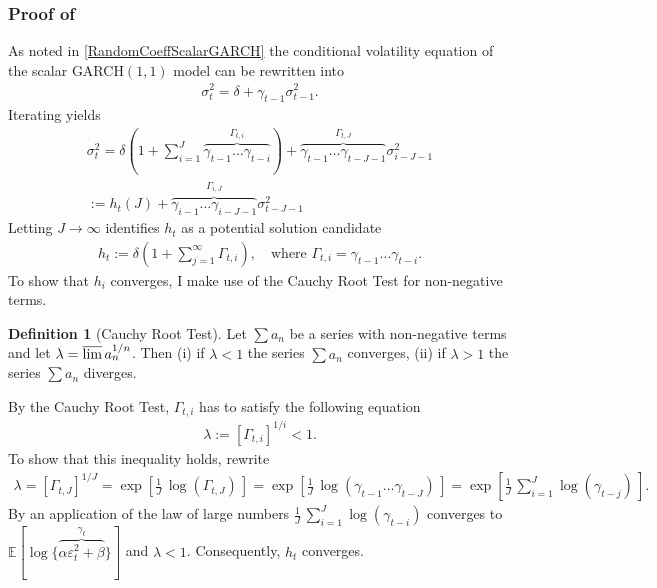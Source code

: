 \documentclass[12pt,a4paper]{article}
\theoremstyle{definition}
\newtheorem{definition}{Definition}[section]
\begin{document}
\subsubsection[Proof of Theorem 2.1]{Proof of }
\label{subsec:Proofofstationarityscalar}
As noted in \cref{RandomCoeffScalarGARCH} the conditional volatility equation of the scalar GARCH$(1,1)$ model can be rewritten into
\begin{gather}
    \sigma_t^2 = \delta + \gamma_{t-1} \sigma_{t-1}^2.
\end{gather}
Iterating yields
\begin{gather}
\label{IterationvolatilityscalarGARCH}
    \sigma_t^2 = \delta \left(1 + \sum_{i=1}^J \overbrace{\gamma_{t-1}\dots\gamma_{t-i}}^{\Gamma_{t,i}}\right)+\overbrace{\gamma_{t-1}\dots\gamma_{t-J-1}}^{\Gamma_{t,J}}\sigma_{i-J-1}^2\\
    := h_t(J) + \overbrace{\gamma_{i-1}\dots\gamma_{i-J-1}}^{\Gamma_{i,J}}\sigma_{t-J-1}^2
\end{gather}
Letting $J \rightarrow \infty$ identifies $h_t$ as a potential solution candidate
\begin{gather}
\label{StationarySolutionScalarGARCH}
    h_t:= \delta \left(1+\sum_{j=1}^\infty \Gamma_{t,i}\right), \quad \text{where } \Gamma_{t,i} = \gamma_{t-1}\dots\gamma_{t-i}.
\end{gather}
To show that $h_i$ converges, I make use of the Cauchy Root Test for non-negative terms.
\begin{definition}[Cauchy Root Test]
    Let $\sum a_n$ be a series with non-negative terms and let $\lambda = \varlimsup a_n^{1/n}$. Then (i) if $\lambda<1$ the series $\sum a_n$ converges, (ii) if $\lambda>1$ the series $\sum a_n$ diverges.
\end{definition}
By the Cauchy Root Test, $\Gamma_{t,i}$ has to satisfy the following equation
\begin{gather}
    \lambda := \left[\Gamma_{t,i}\right]^{1/i} < 1.
\end{gather}
To show that this inequality holds, rewrite
\begin{gather}
    \lambda=\left[\Gamma_{t,J}\right]^{1/J} = \exp \left[\frac{1}{J}\,\log\left(\Gamma_{t,J}\right)\,\right] = \exp \left[\frac{1}{J}\,\log\left(\gamma_{t-1}\dots\gamma_{t-J}\right)\,\right]=\exp \left[\frac{1}{J}\,\sum_{i=1}^J\log\left(\gamma_{t-j}\right)\,\right].
\end{gather}
By an application of the law of large numbers $\frac{1}{J}\,\sum_{i=1}^J\log\left(\gamma_{t-i}\right)$ converges to $\mathbb{E}[ \log\{\overbrace{\alpha\varepsilon_t^2+\beta}^{\gamma_t}\}]$ and $\lambda<1$. Consequently, $h_t$ converges.\\
\end{document}
